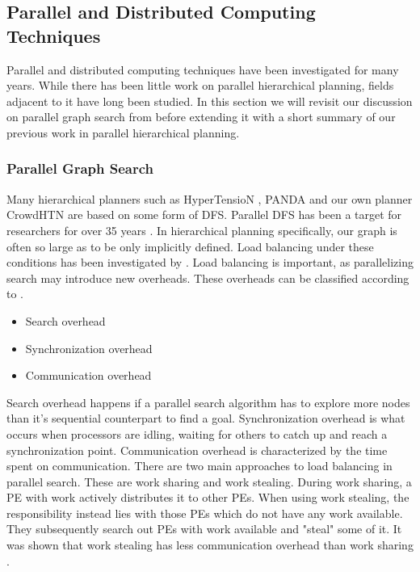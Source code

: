 \subsection{Parallel and Distributed Computing Techniques}
Parallel and distributed computing techniques have been investigated for many years. While there has been little work on parallel hierarchical planning, fields adjacent to it have long been studied. In this section we will revisit our discussion on parallel graph search from \cite{bretl2021parallel} before extending it with a short summary of our previous work in parallel hierarchical planning.

\subsubsection{Parallel Graph Search}
Many hierarchical planners such as HyperTensioN \cite{magnaguagno2020hypertension}, PANDA \cite{holler2020htn} and our own planner CrowdHTN \cite{bretl2021parallel} are based on some form of DFS. Parallel DFS has been a target for researchers for over 35 years \cite{rao1987parallel, kumar1987parallel}. In hierarchical planning specifically, our graph is often so large as to be only implicitly defined. Load balancing under these conditions has been investigated by \cite{sanders1997lastverteilungsalgorithmen}. Load balancing is important, as parallelizing search may introduce new overheads. These overheads can be classified according to \cite{fukunaga2018parallel}.
\begin{itemize}
	\item Search overhead
	\item Synchronization overhead
	\item Communication overhead
\end{itemize}
Search overhead happens if a parallel search algorithm has to explore more nodes than it's sequential counterpart to find a goal. Synchronization overhead is what occurs when processors are idling, waiting for others to catch up and reach a synchronization point. Communication overhead is characterized by the time spent on communication. There are two main approaches to load balancing in parallel search. These are work sharing and work stealing. During work sharing, a PE with work actively distributes it to other PEs.
When using work stealing, the responsibility instead lies with those PEs which do not have any work available. They subsequently search out PEs with work available and "steal" some of it. It was shown that work stealing has less communication overhead than work sharing \cite{blumofe1999scheduling}. \\
